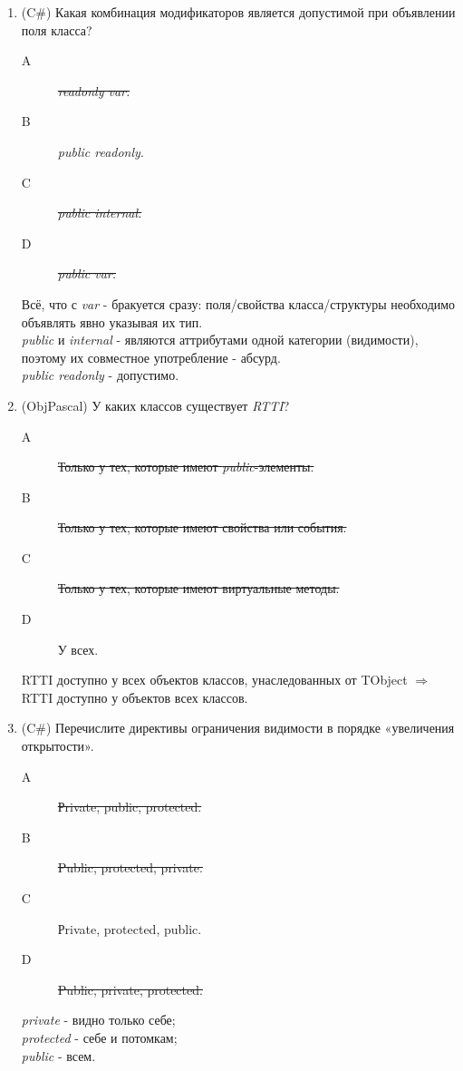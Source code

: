\documentclass[12pt]{article}
\begin{document}
\begin{enumerate}
		\item (C\#) Какая комбинация модификаторов является допустимой при объявлении поля класса?
			\begin{description}
				\item[A] \sout{\emph{readonly var.}}
				\item[B] \emph{public readonly}. 
				\item[C] \sout{\emph{public internal.}}
				\item[D] \sout{\emph{public var.}}
			\end{description}
			Всё, что с \emph{var} - бракуется сразу: поля/свойства класса/структуры необходимо объявлять явно указывая их тип.
			\\
			\emph{public} и \emph{internal} - являются аттрибутами одной категории (видимости), поэтому их совместное употребление - абсурд.
			\\
			\emph{public readonly} - допустимо.

		\item (ObjPascal) У каких классов существует \emph{RTTI}?
			\begin{description}
				\item[A] \sout{Только у тех, которые имеют \emph{public}-элементы.}
				\item[B] \sout{Только у тех, которые имеют свойства или события.}
				\item[C] \sout{Только у тех, которые имеют виртуальные методы.}
				\item[D] У всех.
			\end{description}
			RTTI доступно у всех объектов классов, унаследованных от TObject \ensuremath{ \Rightarrow } RTTI доступно у объектов всех классов.

		\item (C\#) Перечислите директивы ограничения видимости в порядке «увеличения открытости».
			\begin{description}
				\item[A] \sout{Рrivate, public, protected.}
				\item[B] \sout{Public, protected, private.}
				\item[C] Рrivate, protected, public.
				\item[D] \sout{Public, private, protected.}
			\end{description}
			\emph{private} - видно только себе; \\
			\emph{protected} - себе и потомкам; \\
			\emph{public} - всем.


\end{enumerate}
\end{document}
